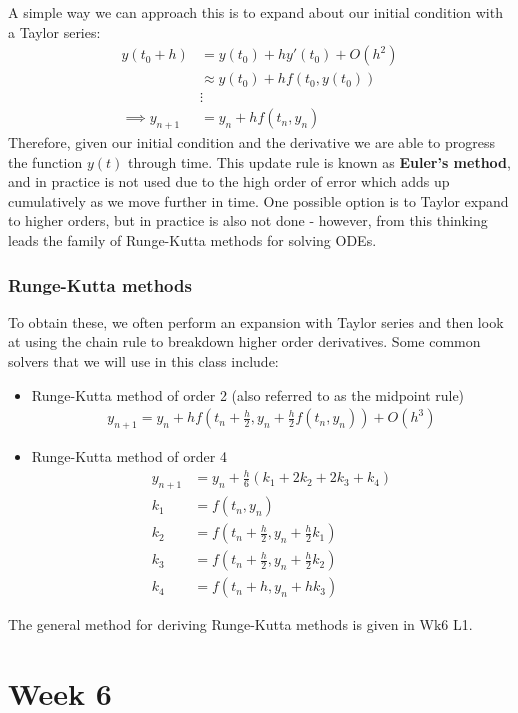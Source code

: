 \documentclass[11pt,a4paper]{report}
\begin{document}
			A simple way we can approach this is to expand about our initial condition with a Taylor series:
			\begin{align}
				y(t_0 + h) &= y(t_0) + hy'(t_0) + O(h^2) \\
				&\approx y(t_0) + h f(t_0, y(t_0)) \\
				&\vdots \\
				\implies y_{n+1} &= y_n + hf(t_n, y_n)
			\end{align}
			Therefore, given our initial condition and the derivative we are able to progress the function $y(t)$ through time. This update rule is known as \textbf{Euler's method}, and in practice is not used due to the high order of error which adds up cumulatively as we move further in time. One possible option is to Taylor expand to higher orders, but in practice is also not done - however, from this thinking leads the family of Runge-Kutta methods for solving ODEs.
			
		\subsubsection{Runge-Kutta methods}
			To obtain these, we often perform an expansion with Taylor series and then look at using the chain rule to breakdown higher order derivatives. Some common solvers that we will use in this class include:
			\begin{itemize}
				\item Runge-Kutta method of order 2 (also referred to as the midpoint rule)
				\begin{align}
					y_{n+1} = y_n + h f\left(t_n + \frac{h}{2}, y_n + \frac{h}{2} f(t_n,y_n)\right) + O(h^3)
				\end{align}
				\item Runge-Kutta method of order 4
				\begin{align}
					y_{n+1} &= y_n + \frac{h}{6} \left( k_1 + 2k_2 + 2k_3 + k_4 \right) \\
					k_1 &= f(t_n,y_n)\nonumber \\
					k_2 &= f\left(t_n + \frac{h}{2}, y_n + \frac{h}{2}k_1\right) \nonumber\\
					k_3 &= f\left(t_n + \frac{h}{2}, y_n + \frac{h}{2}k_2\right) \nonumber\\
					k_4 &= f\left(t_n + h, y_n + hk_3\right) \nonumber
				\end{align}
			\end{itemize}
		The general method for deriving Runge-Kutta methods is given in Wk6 L1.
\newpage
\section{Week 6}
\end{document}
